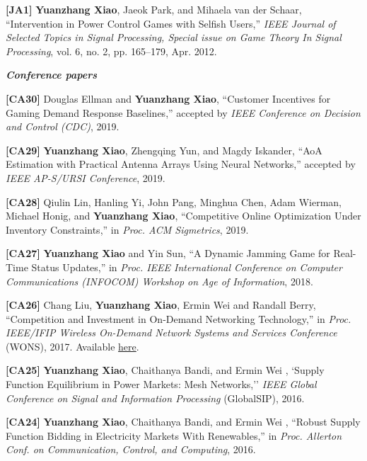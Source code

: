 \documentclass[margin,line]{res}
\begin{document}
\begin{resume}
\textbf{[JA1]} {\bf Yuanzhang Xiao}, Jaeok Park, and Mihaela van der Schaar, ``Intervention in Power Control Games with Selfish Users,'' \emph{IEEE Journal of Selected Topics in Signal Processing, Special issue on Game Theory In Signal Processing}, vol. 6, no. 2, pp. 165--179, Apr. 2012.

%
%

{\em \textbf{Conference papers}}

\vspace{-.3cm}

\textbf{[CA30]} 
Douglas Ellman and {\bf Yuanzhang Xiao}, ``Customer Incentives for Gaming Demand Response Baselines,'' accepted by \emph{IEEE Conference on Decision and Control (CDC)}, 2019.

\textbf{[CA29]}
{\bf Yuanzhang Xiao}, Zhengqing Yun, and Magdy Iskander, ``AoA Estimation with Practical Antenna Arrays Using Neural Networks,'' accepted by \emph{IEEE AP-S/URSI Conference}, 2019.

\textbf{[CA28]}
Qiulin Lin, Hanling Yi, John Pang, Minghua Chen, Adam Wierman, Michael Honig, and {\bf Yuanzhang Xiao}, ``Competitive Online Optimization Under Inventory Constraints,'' in \emph{Proc. ACM Sigmetrics}, 2019.

\textbf{[CA27]}
{\bf Yuanzhang Xiao} and Yin Sun, ``A Dynamic Jamming Game for Real-Time Status Updates,'' in \emph{Proc. IEEE International Conference on Computer Communications (INFOCOM) Workshop on Age of Information}, 2018.

\textbf{[CA26]}
Chang Liu, {\bf Yuanzhang Xiao}, Ermin Wei and Randall Berry, ``Competition and Investment in On-Demand Networking Technology,'' in \emph{Proc. IEEE/IFIP Wireless On-Demand Network Systems and Services Conference} (WONS), 2017. Available \href{http://yuanzhangxiao.com/papers/Liu-XYZ-Wei-Berry-WONS2017.pdf}{here}.

\textbf{[CA25]} {\bf Yuanzhang Xiao}, Chaithanya Bandi, and Ermin Wei , `Supply Function Equilibrium in Power Markets: Mesh Networks,'' \emph{IEEE Global Conference on Signal and Information Processing} (GlobalSIP), 2016.

\textbf{[CA24]} {\bf Yuanzhang Xiao}, Chaithanya Bandi, and Ermin Wei , ``Robust Supply Function Bidding
in Electricity Markets With Renewables,'' in \emph{Proc. Allerton Conf. on Communication, Control, and Computing}, 2016.


\end{resume}
\end{document}
